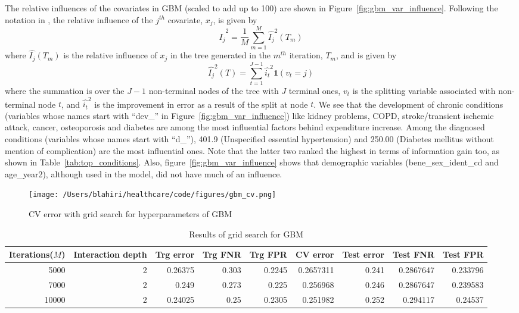 The relative influences of the covariates in GBM (scaled to add up to 100) are shown in Figure~\ref{fig:gbm_var_influence}. Following the notation in \cite{Friedman01}, the relative influence of the $j^{th}$ covariate, $x_j$, is given by 
\begin{equation}
\label{eqn:rel_inf_j}
{\hat{I_j}}^2 = \frac{1}{M}\sum_{m=1}^M{{\hat{I_j}}^2(T_m)}
\end{equation}
where $\hat{I_j}(T_m)$ is the relative influence of $x_j$ in the tree generated in the $m^{th}$ iteration, $T_m$, and is given by 
\begin{equation}
\label{eqn:rel_inf_j_T}
{\hat{I_j}}^2(T) = \sum_{t=1}^{J-1}{{\hat{i_t}}^2\mathbf{1}(v_t = j)}
\end{equation}
where the summation is over the $J-1$ non-terminal nodes of the tree with $J$ terminal ones, $v_t$ is the splitting variable associated with non-terminal node $t$, and ${\hat{i_t}}^2$ is the improvement in error as a result of the split at node $t$. We see that the development of chronic conditions (variables whose names start with ``dev\_'' in Figure~\ref{fig:gbm_var_influence}) like kidney problems, COPD, stroke/transient ischemic attack, cancer, osteoporosis and diabetes are among the most influential factors behind expenditure increase. Among the diagnosed conditions (variables whose names start with ``d\_''), 401.9 (Unspecified essential hypertension) and 250.00 (Diabetes mellitus without mention of complication) are the most influential ones. Note that the latter two ranked the highest in terms of information gain too, as shown in Table~\ref{tab:top_conditions}. Also, figure~\ref{fig:gbm_var_influence} shows that demographic variables (bene\_sex\_ident\_cd and age\_year2), although used in the model, did not have much of an influence. 

\begin{figure}[!h]
    \centering
    \texttt{[image: /Users/blahiri/healthcare/code/figures/gbm\_cv.png]}
    \caption{\small CV error with grid search for hyperparameters of GBM}
    \label{fig:gbm_cv}
\end{figure}

\begin{table*}[!h]
\centering
\caption{Results of grid search for GBM}
\begin{tabular}{rrrrrrrrr}
\hline
Iterations($M$) & Interaction depth & Trg error & Trg FNR & Trg FPR & CV error & Test error & Test FNR & Test FPR\\
\hline
5000 & 2 & 0.26375 & 0.303 & 0.2245 & 0.2657311 & 0.241 & 0.2867647 & 0.233796\\
7000 & 2 & 0.249 & 0.273 & 0.225 & 0.256968 & 0.246 & 0.2867647 & 0.239583\\
10000 & 2 & 0.24025 & 0.25 & 0.2305 & 0.251982 & 0.252 & 0.294117 & 0.24537\\
\hline
\end{tabular}
\label{tab:gbm_cv}
\end{table*}

